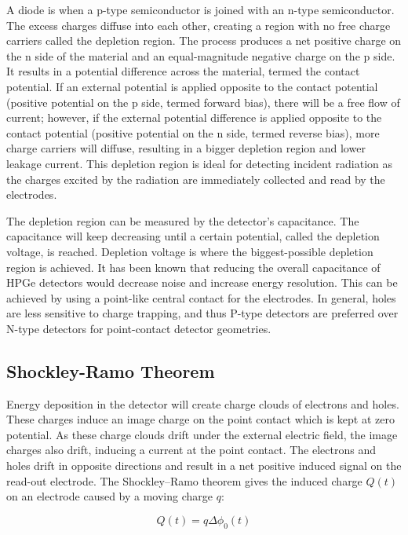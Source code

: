 A diode is when a p-type semiconductor is joined with an n-type semiconductor. The excess charges diffuse into each other, creating a region with no free charge carriers called the depletion region. The process produces a net positive charge on the n side of the material and an equal-magnitude negative charge on the p side. It results in a potential difference across the material, termed the contact potential. If an external potential is applied opposite to the contact potential (positive potential on the p side, termed forward bias), there will be a free flow of current; however, if the external potential difference is applied opposite to the contact potential (positive potential on the n side, termed reverse bias), more charge carriers will diffuse, resulting in a bigger depletion region and lower leakage current. This depletion region is ideal for detecting incident radiation as the charges excited by the radiation are immediately collected and read by the electrodes.

The depletion region can be measured by the detector's capacitance. The capacitance will keep decreasing until a certain potential, called the depletion voltage, is reached. Depletion voltage is where the biggest-possible depletion region is achieved. It has been known that reducing the overall capacitance of HPGe detectors would decrease noise and increase energy resolution. This can be achieved by using a point-like central contact for the electrodes. In general, holes are less sensitive to charge trapping, and thus P-type detectors are preferred over N-type detectors for point-contact detector geometries.

\subsection{Shockley-Ramo Theorem}
Energy deposition in the detector will create charge clouds of electrons and holes. These charges induce an image charge on the point contact which is kept at zero potential. As these charge clouds drift under the external electric field, the image charges also drift, inducing a current at the point contact. The electrons and holes drift in opposite directions and result in a net positive induced signal on the read-out electrode. The Shockley–Ramo theorem gives the induced charge $Q(t)$ on an electrode caused by a moving charge $q$:

\begin{equation}\label{wp_eq}
Q(t)=q\Delta \phi_0(t)
\end{equation}

